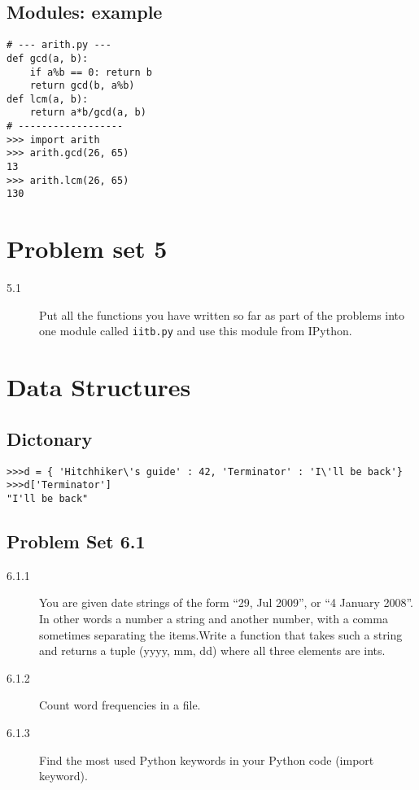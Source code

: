 \documentclass[12pt]{article}
\begin{document}
  \subsection{Modules: example}
  \begin{verbatim}
# --- arith.py ---
def gcd(a, b):
    if a%b == 0: return b
    return gcd(b, a%b)
def lcm(a, b):
    return a*b/gcd(a, b)
# ------------------
>>> import arith
>>> arith.gcd(26, 65)
13
>>> arith.lcm(26, 65)
130
  \end{verbatim}
\section{Problem set 5}
  \begin{description}
    \item[5.1] Put all the functions you have written so far as part of the problems
  into one module called \texttt{iitb.py} and use this module from IPython.
  \end{description}
\newpage

\section{Data Structures}

   \subsection{Dictonary}
   \begin{verbatim}
>>>d = { 'Hitchhiker\'s guide' : 42, 'Terminator' : 'I\'ll be back'}
>>>d['Terminator']
"I'll be back"
   \end{verbatim}

\subsection{Problem Set 6.1}
\begin{description}
\item[6.1.1] You are given date strings of the form ``29, Jul 2009'', or ``4 January 2008''. In other words a number a string and another number, with a comma sometimes separating the items.Write a function that takes such a string and returns a tuple (yyyy, mm, dd) where all three elements are ints.
\item[6.1.2] Count word frequencies in a file.
\item[6.1.3] Find the most used Python keywords in your Python code (import keyword).
\end{description}
\end{document}
